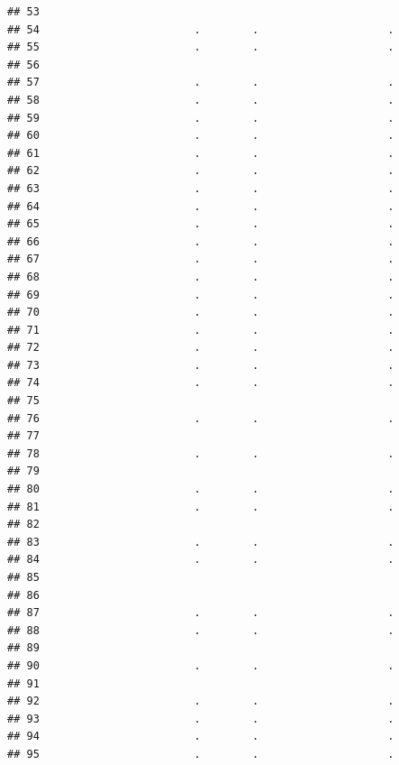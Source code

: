 \documentclass[
]{article}
\begin{document}
\begin{verbatim}
## 53                                                       
## 54                        .        .                    .
## 55                        .        .                    .
## 56                                                       
## 57                        .        .                    .
## 58                        .        .                    .
## 59                        .        .                    .
## 60                        .        .                    .
## 61                        .        .                    .
## 62                        .        .                    .
## 63                        .        .                    .
## 64                        .        .                    .
## 65                        .        .                    .
## 66                        .        .                    .
## 67                        .        .                    .
## 68                        .        .                    .
## 69                        .        .                    .
## 70                        .        .                    .
## 71                        .        .                    .
## 72                        .        .                    .
## 73                        .        .                    .
## 74                        .        .                    .
## 75                                                       
## 76                        .        .                    .
## 77                                                       
## 78                        .        .                    .
## 79                                                       
## 80                        .        .                    .
## 81                        .        .                    .
## 82                                                       
## 83                        .        .                    .
## 84                        .        .                    .
## 85                                                       
## 86                                                       
## 87                        .        .                    .
## 88                        .        .                    .
## 89                                                       
## 90                        .        .                    .
## 91                                                       
## 92                        .        .                    .
## 93                        .        .                    .
## 94                        .        .                    .
## 95                        .        .                    .

\end{verbatim}
\end{document}
